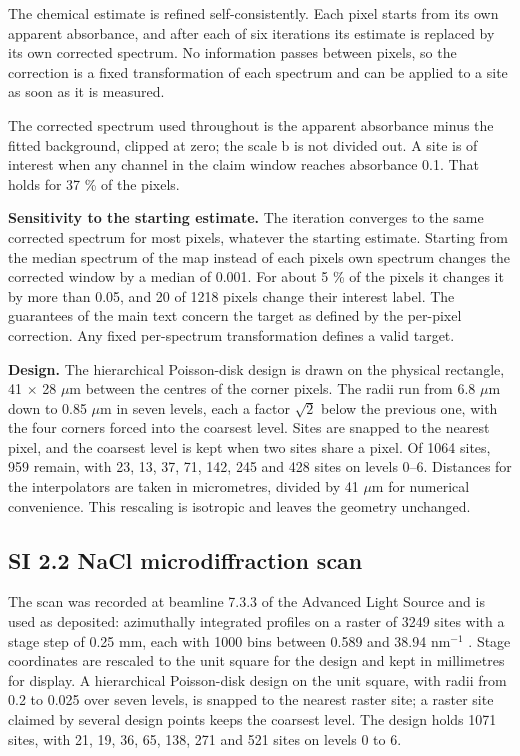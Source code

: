 \documentclass{iopjournal}
\begin{document}
The chemical estimate is refined self-consistently. Each pixel starts from its own apparent absorbance, and after each of six iterations its estimate is replaced by its own corrected spectrum. No information passes between pixels, so the correction is a fixed transformation of each spectrum and can be applied to a site as soon as it is measured.

The corrected spectrum used throughout is the apparent absorbance minus the fitted background, clipped at zero; the scale b is not divided out. A site is of interest when any channel in the claim window reaches absorbance 0.1. That holds for 37 \% of the pixels.

\textbf{Sensitivity to the starting estimate.} The iteration converges to the same corrected spectrum for most pixels, whatever the starting estimate. Starting from the median spectrum of the map instead of each pixel\textquotesingle s own spectrum changes the corrected window by a median of 0.001. For about 5 \% of the pixels it changes it by more than 0.05, and 20 of 1218 pixels change their interest label. The guarantees of the main text concern the target as defined by the per-pixel correction. Any fixed per-spectrum transformation defines a valid target.

\textbf{Design.} The hierarchical Poisson-disk design is drawn on the physical rectangle, 41 \ensuremath{\times} 28 \ensuremath{\mu}m between the centres of the corner pixels. The radii run from 6.8 \ensuremath{\mu}m down to 0.85 \ensuremath{\mu}m in seven levels, each a factor \(\sqrt{2}\) below the previous one, with the four corners forced into the coarsest level. Sites are snapped to the nearest pixel, and the coarsest level is kept when two sites share a pixel. Of 1064 sites, 959 remain, with 23, 13, 37, 71, 142, 245 and 428 sites on levels 0--6. Distances for the interpolators are taken in micrometres, divided by 41 \ensuremath{\mu}m for numerical convenience. This rescaling is isotropic and leaves the geometry unchanged.

\hypertarget{si-2.2-nacl-microdiffraction-scan}{%
\subsection*{SI 2.2 NaCl microdiffraction scan}\label{si-2.2-nacl-microdiffraction-scan}}

The scan was recorded at beamline 7.3.3 of the Advanced Light Source and is used as deposited: azimuthally integrated profiles on a raster of 3249 sites with a stage step of 0.25 mm, each with 1000 bins between 0.589 and 38.94 nm\ensuremath{^{-1}} \cite{ALSNaCl}. Stage coordinates are rescaled to the unit square for the design and kept in millimetres for display. A hierarchical Poisson-disk design on the unit square, with radii from 0.2 to 0.025 over seven levels, is snapped to the nearest raster site; a raster site claimed by several design points keeps the coarsest level. The design holds 1071 sites, with 21, 19, 36, 65, 138, 271 and 521 sites on levels 0 to 6.
\end{document}
